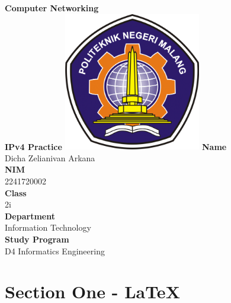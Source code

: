 \documentclass[12pt,titlepage]{article}
\newcommand{\vSubject}{Computer Networking}
\newcommand{\vSubtitle}{IPv4 Practice}
\newcommand{\vName}{Dicha Zelianivan Arkana}
\newcommand{\vNIM}{2241720002}
\newcommand{\vClass}{2i}
\newcommand{\vDepartment}{Information Technology}
\newcommand{\vStudyProgram}{D4 Informatics Engineering}
\begin{document}
\begin{titlepage}
    \centering
    \vfill
    {\bfseries\LARGE
        \vSubject\\
        \vskip0.25cm
        \vSubtitle
    }
    \vfill
    \includegraphics[width=6cm]{images/polinema-logo.png}
    \vfill
    {
        \textbf{Name}\\
        \vName\\
        \vskip0.5cm
        \textbf{NIM}\\
        \vNIM\\
        \vskip0.5cm
        \textbf{Class}\\
        \vClass\\
        \vskip0.5cm
        \textbf{Department}\\
        \vDepartment\\
        \vskip0.5cm
        \textbf{Study Program}\\
        \vStudyProgram
    }
\end{titlepage}

\section{Section One - \LaTeX}
\end{document}

